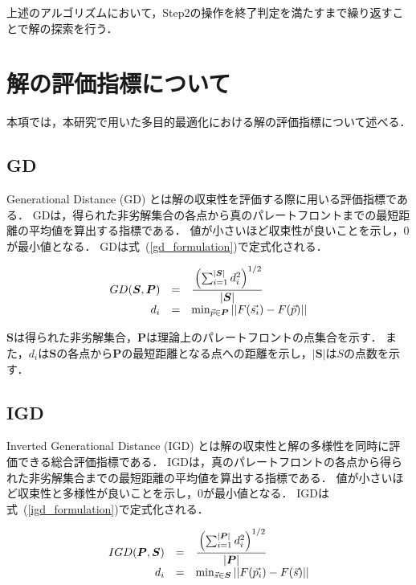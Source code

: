 \documentclass[11pt,a4j,notitlepage]{jreport}
\newcommand{\Eqref}[1]{式~(\ref{#1})}
\begin{document}
上述のアルゴリズムにおいて，Step2の操作を終了判定を満たすまで繰り返すことで解の探索を行う．


\section{解の評価指標について}
\quad 本項では，本研究で用いた多目的最適化における解の評価指標について述べる．

\subsection{GD}
Generational Distance (GD)\cite{Deb2002Fast} とは解の収束性を評価する際に用いる評価指標である．
GDは，得られた非劣解集合の各点から真のパレートフロントまでの最短距離の平均値を算出する指標である．
値が小さいほど収束性が良いことを示し，0が最小値となる．
GDは\Eqref{gd_formulation}で定式化される．

\begin{eqnarray}
\begin{array}{rcl}
GD(\bm S,\bm P)&=&\cfrac{\left( \sum^{|\bm S|}_{i=1} d_i^2 \right) ^ {1/2}}{|\bm S|}\\
d_i & = & \min_{\vec p \in \bm P} || F(\vec{s_i}) - F(\vec p) ||
\label{gd_formulation}
\end{array}
\end{eqnarray}

$\bm S$は得られた非劣解集合，$\bm P$は理論上のパレートフロントの点集合を示す．
また，$d_i$は$\bm S$の各点から$\bm P$の最短距離となる点への距離を示し，$|\bm S|$は$S$の点数を示す．


\subsection{IGD}
Inverted Generational Distance (IGD)\cite{Zhou2006combining} とは解の収束性と解の多様性を同時に評価できる総合評価指標である．
IGDは，真のパレートフロントの各点から得られた非劣解集合までの最短距離の平均値を算出する指標である．
値が小さいほど収束性と多様性が良いことを示し，0が最小値となる．
IGDは\Eqref{igd_formulation}で定式化される．

\begin{eqnarray}
\begin{array}{rcl}
IGD(\bm P,\bm S)&=&\cfrac{\left( \sum^{|\bm P|}_{i=1} d_i^2 \right) ^ {1/2}}{|\bm P|}\\
d_i & = & \min_{\vec s \in \bm S} || F(\vec{p_i}) - F(\vec s) ||
\label{igd_formulation}
\end{array}
\end{eqnarray}
\end{document}
